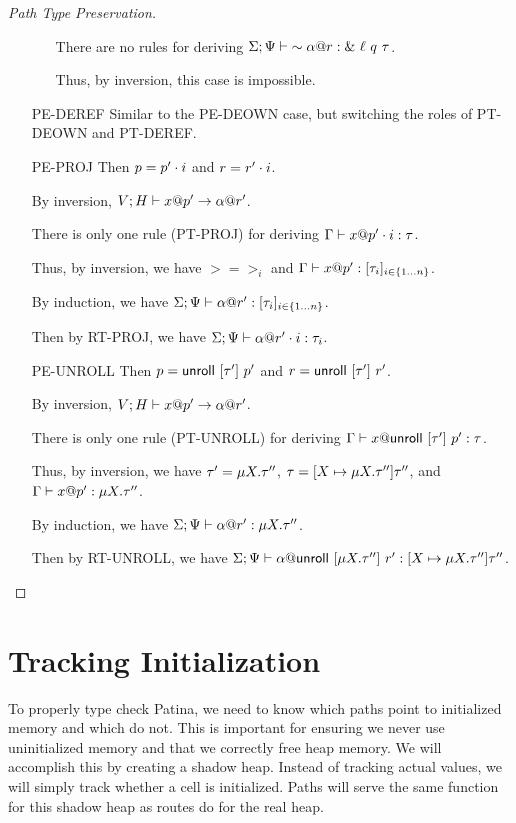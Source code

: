 \begin{proof}[Path Type Preservation]
\begin{itemize}
\begin{itemize}
	  There are no rules for deriving
	  ${\Sigma;\Psi} \vdash {\sim{{\alpha}@{r}}} : {\&~{{\ell}~{q}~{\tau}}}$.

	  Thus, by inversion, this case is impossible.
      \end{itemize}
    \item[PE-DEREF] 
      Similar to the \textsc{PE-DEOWN} case, but switching the roles of
      \textsc{PT-DEOWN} and \textsc{PT-DEREF}.
    \item[PE-PROJ] Then $p = {p'}\cdot{i}$ and $r = {r'}\cdot{i}$.

      By inversion, ${V;H} \vdash {{x}@{p'}} \to {{\alpha}@{r'}}$.

      There is only one rule (\textsc{PT-PROJ}) for deriving ${\Gamma} \vdash {{x}@{{p'}\cdot{i}}} : {\tau}$.

      Thus, by inversion, we have $\gt = \gt_i$ and ${\Gamma} \vdash {{x}@{p'}} : {[{{\tau}_{i}}]_{{i} \in \{1 \ldots {n}\} }}$.

      By induction, we have ${\Sigma;\Psi} \vdash {{\alpha}@{r'}} : {[{{\tau}_{i}}]_{{i} \in \{1 \ldots {n}\} }}$.

      Then by \textsc{RT-PROJ}, we have ${\Sigma;\Psi} \vdash {{\alpha}@{{r'}\cdot{i}}} : {\tau_i}$.
    \item[PE-UNROLL] Then $p = \mathsf{unroll}~[{\tau'}]~{p'}$ and $r = \mathsf{unroll}~[{\tau'}]~{r'}$.

      By inversion, ${V;H} \vdash {{x}@{p'}} \to {{\alpha}@{r'}}$.

      There is only one rule (\textsc{PT-UNROLL}) for deriving
      ${\Gamma} \vdash {{x}@{\mathsf{unroll}~[{\tau'}]~{p'}}} : {\tau}$.

      Thus, by inversion, we have $\tau' = \mu {X}.{\tau''}$,
      $\tau = [{X} \mapsto {\mu {X}.{\tau''}}] {\tau''}$, and
      ${\Gamma} \vdash {{x}@{p'}} : {\mu {X}.{\tau''}}$.

      By induction, we have ${\Sigma;\Psi} \vdash {{\alpha}@{r'}} : {\mu {X}.{\tau''}}$.

      Then by \textsc{RT-UNROLL}, we have
      ${\Sigma;\Psi} \vdash {{\alpha}@{\mathsf{unroll}~[{\mu {X}.{\tau''}}]~{r'}}} : {[{X} \mapsto {\mu {X}.{\tau''}}] {\tau''}}$.
  \end{itemize}
\end{proof}

\section*{Tracking Initialization}
To properly type check Patina, we need to know which paths point to initialized memory
and which do not. This is important for ensuring we never use uninitialized memory and
that we correctly free heap memory.
We will accomplish this by creating a shadow heap.
Instead of tracking actual values, we will simply track whether a cell is initialized.
Paths will serve the same function for this shadow heap as routes do for the real heap.

